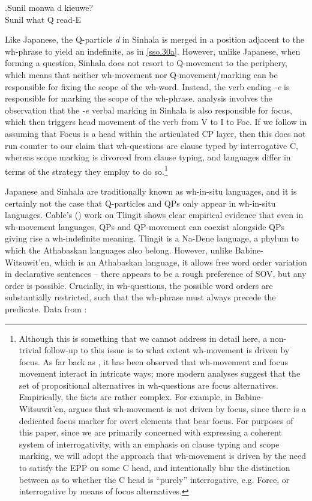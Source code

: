 \documentclass{glossa}
\begin{document}
\exg.\label{sso.31}Sunil mon{\textschwa}wa d{\textschwa} kieuwe?\\
   Sunil what Q read-E\\

Like Japanese, the Q-particle \textit{d\textschwa} in Sinhala is merged in a position adjacent to the wh-phrase to yield an indefinite, as in \ref{sso.30a}. However, unlike Japanese, when forming a question, Sinhala does not resort to Q-movement to the periphery, which means that neither wh-movement nor Q-movement/marking can be responsible for fixing the scope of the wh-word. Instead, the verb ending \textit{-e} is responsible for marking the scope of the wh-phrase. \cite{slade:2011} analysis involves the observation that the \textit{-e} verbal marking in Sinhala is also responsible for focus, which then triggers head movement of the verb from V to I to Foc. If we follow \cite{rizzi:1997} in assuming that Focus is a head within the articulated CP layer, then this does not run counter to our claim that wh-questions are clause typed by interrogative C, whereas scope marking is divorced from clause typing, and languages differ in terms of the strategy they employ to do so.\footnote{Although this is something that we cannot address in detail here, a non-trivial follow-up to this issue is to what extent wh-movement is driven by focus. As far back as \cite{huang:1982}, it has been observed that wh-movement and focus movement interact in intricate ways; more modern analyses \citep{beck:2006} suggest that the set of propositional alternatives in wh-questions are focus alternatives. Empirically, the facts are rather complex. For example, in Babine-Witsuwit'en, \cite{denham:2000} argues that wh-movement is not driven by focus, since there is a dedicated focus marker for overt elements that bear focus. For purposes of this paper, since we are primarily concerned with expressing a coherent system of interrogativity, with an emphasis on clause typing and scope marking, we will adopt the approach that wh-movement is driven by the need to satisfy the EPP on some C head, and intentionally blur the distinction between as to whether the C head is ``purely'' interrogative, e.g. Force, or interrogative by means of focus alternatives.}

Japanese and Sinhala are traditionally known as wh-in-situ languages, and it is certainly not the case that Q-particles and QPs only appear in wh-in-situ languages. Cable's (\citeyear{cable:2007}) work on Tlingit shows clear empirical evidence that even in wh-movement languages, QPs and QP-movement can coexist alongside QPs giving rise a wh-indefinite meaning. Tlingit is a Na-Dene language, a phylum to which the Athabaskan languages also belong. However, unlike Babine-Witsuwit'en, which is an Athabaskan language, it allows free word order variation in declarative sentences -- there appears to be a rough preference of SOV, but any order is possible. Crucially, in wh-questions, the possible word orders are substantially restricted, such that the wh-phrase must always precede the predicate. Data from \cite[63--66]{cable:2007}:
\end{document}
